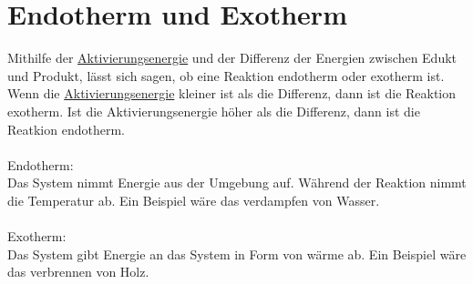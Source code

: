 
\section{Endotherm und Exotherm}\label{sec:endo_exotherm}
Mithilfe der \hyperref[sec:aktivierungsenergie]{Aktivierungsenergie} und der Differenz der Energien zwischen Edukt und Produkt,
lässt sich sagen, ob eine Reaktion endotherm oder exotherm ist.
Wenn die \hyperref[sec:aktivierungsenergie]{Aktivierungsenergie} kleiner ist als die Differenz, dann ist die Reaktion exotherm.
Ist die Aktivierungsenergie höher als die Differenz, dann ist die Reatkion endotherm. \\ \\
Endotherm:\\
Das System nimmt Energie aus der Umgebung auf. 
Während der Reaktion nimmt die Temperatur ab.
Ein Beispiel wäre das verdampfen von Wasser. \\ \\
Exotherm: \\
Das System gibt Energie an das System in Form von wärme ab.
Ein Beispiel wäre das verbrennen von Holz.

